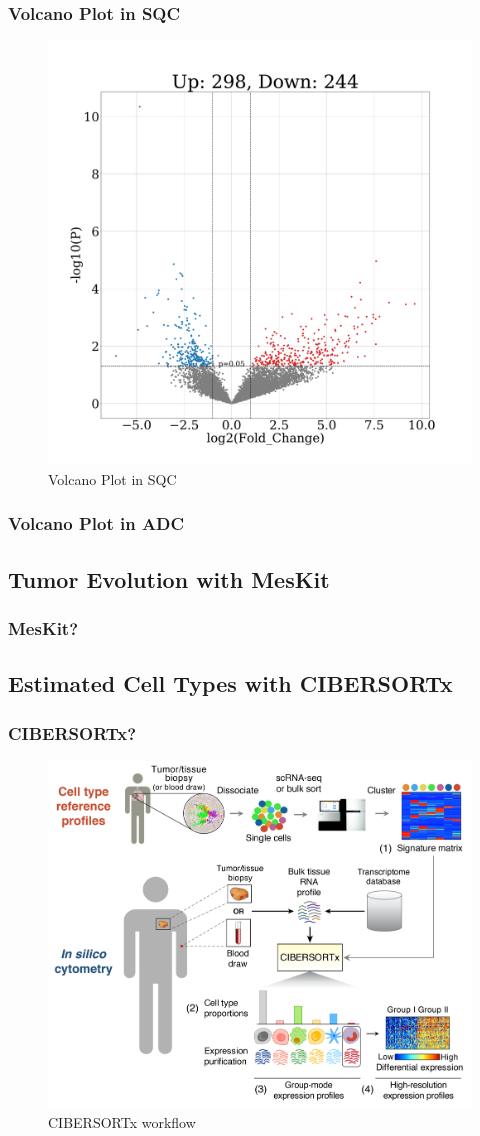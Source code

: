 \documentclass{beamer}
\begin{document}
    \begin{frame}
        \frametitle{Volcano Plot in SQC}

        \begin{figure}
            \includegraphics[width=0.5 \linewidth]{figures/DEG/SQC.Bowtie2.volcano.pdf}
            \caption{Volcano Plot in SQC}
        \end{figure}
    \end{frame}

    \begin{frame}
        \frametitle{Volcano Plot in ADC}
    \end{frame}

    \subsection{Tumor Evolution with MesKit}
    \begin{frame}
        \frametitle{MesKit?}
    \end{frame}

    \subsection{Estimated Cell Types with CIBERSORTx}
    \begin{frame}
        \frametitle{CIBERSORTx?}

        \begin{figure}
            \includegraphics[width=0.6 \linewidth]{figures/Workflow/CIBERSORTx.png}
            \caption{CIBERSORTx workflow \protect\cite{cibersort1}}
        \end{figure}
    \end{frame}
\end{document}
